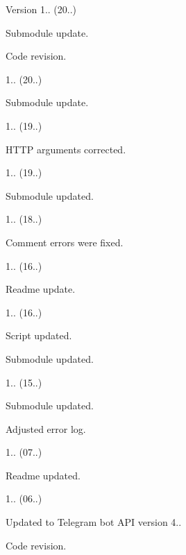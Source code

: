 \begin{DoxyVersion}{Version}
1.. (20..)
\begin{DoxyItemize}
\item Submodule update.
\item Code revision. 
\end{DoxyItemize}

1.. (20..)
\begin{DoxyItemize}
\item Submodule update. 
\end{DoxyItemize}

1.. (19..)
\begin{DoxyItemize}
\item H\+T\+TP arguments corrected. 
\end{DoxyItemize}

1.. (19..)
\begin{DoxyItemize}
\item Submodule updated. 
\end{DoxyItemize}

1.. (18..)
\begin{DoxyItemize}
\item Comment errors were fixed. 
\end{DoxyItemize}

1.. (16..)
\begin{DoxyItemize}
\item Readme update. 
\end{DoxyItemize}

1.. (16..)
\begin{DoxyItemize}
\item Script updated.
\item Submodule updated. 
\end{DoxyItemize}

1.. (15..)
\begin{DoxyItemize}
\item Submodule updated.
\item Adjusted error log. 
\end{DoxyItemize}

1.. (07..)
\begin{DoxyItemize}
\item Readme updated. 
\end{DoxyItemize}

1.. (06..)
\begin{DoxyItemize}
\item Updated to Telegram bot A\+PI version 4..
\item Code revision. 
\end{DoxyItemize}


\end{DoxyVersion}
